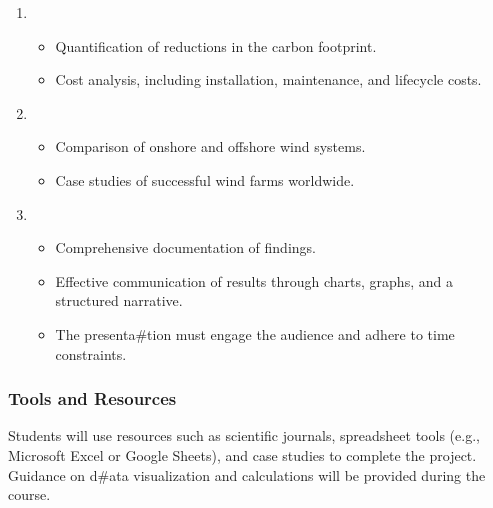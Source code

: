 \documentclass[letterpaper,10pt,english]{jupyterBook}
\begin{document}
\begin{enumerate}
\item {} 
\sphinxAtStartPar
{}
\begin{itemize}
\item {} 
\sphinxAtStartPar
Quantification of reductions in the carbon footprint.

\item {} 
\sphinxAtStartPar
Cost analysis, including installation, maintenance, and
lifecycle costs.

\end{itemize}

\item {} 
\sphinxAtStartPar
{}
\begin{itemize}
\item {} 
\sphinxAtStartPar
Comparison of onshore and offshore wind systems.

\item {} 
\sphinxAtStartPar
Case studies of successful wind farms worldwide.

\end{itemize}

\item {} 
\sphinxAtStartPar
{}
\begin{itemize}
\item {} 
\sphinxAtStartPar
Comprehensive documentation of findings.

\item {} 
\sphinxAtStartPar
Effective communication of results through charts, graphs, and a
structured narrative.

\item {} 
\sphinxAtStartPar
The presenta\#tion must engage the audience and adhere to time
constraints.

\end{itemize}

\end{enumerate}


\subsubsection{Tools and Resources}
\label{\detokenize{ProjectSyllabus:tools-and-resources}}
\sphinxAtStartPar
Students will use resources such as scientific journals, spreadsheet
tools (e.g., Microsoft Excel or Google Sheets), and case studies to
complete the project. Guidance on d\#ata visualization and calculations
will be provided during the course.
\end{document}
